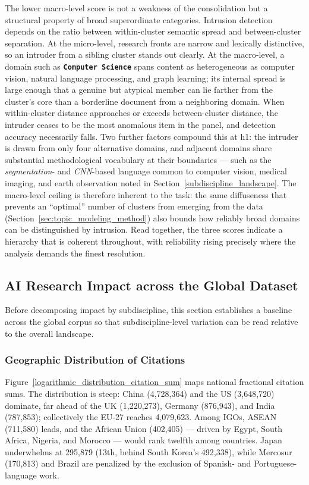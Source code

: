 \documentclass{article}
\begin{document}
	The lower macro-level score is not a weakness of the consolidation but a structural property of broad superordinate categories. Intrusion detection depends on the ratio between within-cluster semantic spread and between-cluster separation. At the micro-level, research fronts are narrow and lexically distinctive, so an intruder from a sibling cluster stands out clearly. At the macro-level, a domain such as \textbf{\texttt{Computer Science}}  spans content as heterogeneous as computer vision, natural language processing, and graph learning; its internal spread is large enough that a genuine but atypical member can lie farther from the cluster's core than a borderline document from a neighboring domain. When within-cluster distance approaches or exceeds between-cluster distance, the intruder ceases to be the most anomalous item in the panel, and detection accuracy necessarily falls. Two further factors compound this at h1: the intruder is drawn from only four alternative domains, and adjacent domains share substantial methodological vocabulary at their boundaries --- such as the \textit{segmentation}- and \textit{CNN}-based language common to computer vision, medical imaging, and earth observation noted in Section~\ref{subdiscipline_landscape}. The macro-level ceiling is therefore inherent to the task: the same diffuseness that prevents an ``optimal'' number of clusters from emerging from the data (Section~\ref{sec:topic_modeling_method}) also bounds how reliably broad domains can be distinguished by intrusion. Read together, the three scores indicate a hierarchy that is coherent throughout, with reliability rising precisely where the analysis demands the finest resolution.
	
	\subsection{AI Research Impact across the Global Dataset}
	\label{impact_across_global_dataset}
	
	Before decomposing impact by subdiscipline, this section establishes a baseline across the global corpus so that subdiscipline-level variation can be read relative to the overall landscape.
	
	\subsubsection{Geographic Distribution of Citations}
	\label{citation_geomapping}
	
	Figure~\ref{logarithmic_distribution_citation_sum} maps national fractional citation sums. The distribution is steep: China (4,728,364) and the US (3,648,720) dominate, far ahead of the UK (1,220,273), Germany (876,943), and India (787,853); collectively the EU-27 reaches 4,079,623. Among IGOs, ASEAN (711,580) leads, and the African Union (402,405) --- driven by Egypt, South Africa, Nigeria, and Morocco --- would rank twelfth among countries. Japan underwhelms at 295,879 (13th, behind South Korea's 492,338), while Mercosur (170,813) and Brazil are penalized by the exclusion of Spanish- and Portuguese-language work.
	
\end{document}

